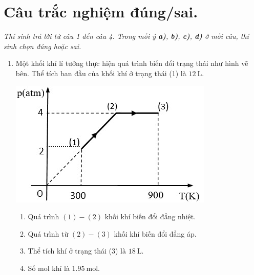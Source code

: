 \section{Câu trắc nghiệm đúng/sai.} 
\textit{Thí sinh trả lời từ câu 1 đến câu 4. Trong mỗi ý \textbf{a)}, \textbf{b)}, \textbf{c)}, \textbf{d)} ở mỗi câu, thí sinh chọn đúng hoặc sai.}
\begin{enumerate}[label=\bfseries Câu \arabic*:, leftmargin=1.7cm]
	\item Một khối khí lí tưởng thực hiện quá trình biến đổi trạng thái như hình vẽ bên. Thể tích ban đầu của khối khí ở trạng thái (1) là $\SI{12}{\liter}$.
	\begin{center}
		\includegraphics[width=0.45\linewidth]{../figs/VN12-Y24-PH-SYL-016-2}
	\end{center}
\begin{enumerate}[label=\alph*)]
	\item Quá trình $(1) - (2)$ khối khí biến đổi đẳng nhiệt.
	\item Quá trình từ $(2) - (3)$ khối khí biến đổi đẳng áp.
	\item Thể tích khí ở trạng thái (3) là $\SI{18}{\liter}$.
	\item Số mol khí là $\SI{1.95}{\mole}$.
\end{enumerate}


\end{enumerate}
